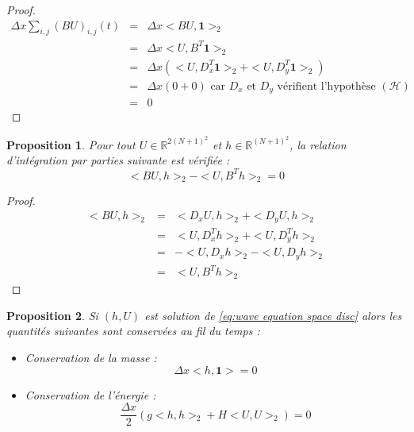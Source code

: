 \documentclass[10pt,a4paper]{article}
\newtheorem{proposition}{Proposition}
\begin{document}
\begin{proof}
$$
\begin{array}{rcl}
\Delta x \sum_{i,j} (BU)_{i,j}(t) & = & \Delta x <BU, \mathbf{1}>_2 \\
                                  & = & \Delta x <U,B^T \mathbf{1}>_2 \\
                                  & = & \Delta x \left( <U,D_x^T \mathbf{1}>_2 + <U,D_y^T \mathbf{1}>_2 \right)\\
                                  & = & \Delta x \left( 0+0 \right) \text{  car $D_x$ et $D_y$ vérifient l'hypothèse $\left( \mathcal{H} \right)$}\\
                                  & = & 0
\end{array}
$$
\end{proof}

\begin{proposition}
Pour tout $U \in \mathbb{R}^{2 (N+1)^2}$ et $h \in \mathbb{R}^{(N+1)^2}$, la relation d'intégration par parties suivante est vérifiée :
\begin{equation}
<BU,h>_2-<U,B^Th>_2=0
\label{eq:ipp disc}
\end{equation}
\end{proposition}

\begin{proof}
$$
\begin{array}{rcl}
<BU,h>_2 & = & <D_x U,h>_2 + <D_y U,h>_2 \\
         & = & <U,D_x^T h>_2 + <U,D_y^T h>_2 \\
         & = & -<U,D_x h>_2 - <U,D_y h>_2 \\
         & = & <U,B^T h>_2
\end{array}
$$
\end{proof}

\begin{proposition}
Si $(h,U)$ est solution de \eqref{eq:wave equation space disc} alors les quantités suivantes sont conservées au fil du temps :
\begin{itemize}
\item Conservation de la masse :
\begin{equation}
\Delta x <h,\mathbf{1}> = 0
\end{equation}
\item Conservation de l'énergie :
\begin{equation}
\dfrac{\Delta x}{2} \left( g<h,h>_2 + H<U ,U>_2\right)=0
\end{equation}
\end{itemize}
\end{proposition}
\end{document}
